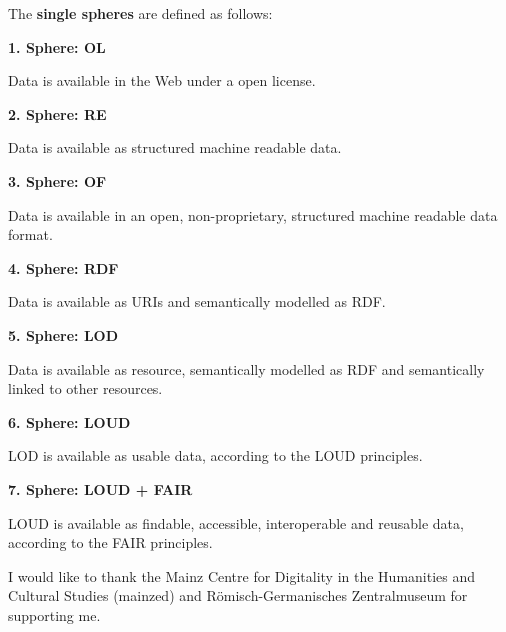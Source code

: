 \documentclass[twocolumn]{autart}
\begin{document}
The \textbf{\textcolor[rgb]{0.5,0,0.5}{single spheres}} are defined as follows:

\textcolor[rgb]{0.5,0,0.5}{\textbf{1. Sphere: OL}}

Data is available in the Web under a open license.

\textcolor[rgb]{0.5,0,0.5}{\textbf{2. Sphere: RE}}

Data is available as structured machine readable data.

\textcolor[rgb]{0.5,0,0.5}{\textbf{3. Sphere: OF}}

Data is available in an open, non-proprietary, structured machine readable data format.

\textcolor[rgb]{0.5,0,0.5}{\textbf{4. Sphere: RDF}}

Data is available as URIs and semantically modelled as RDF.

\textcolor[rgb]{0.5,0,0.5}{\textbf{5. Sphere: LOD}}

Data is available as resource, semantically modelled as RDF and semantically linked to other resources.

\textcolor[rgb]{0.5,0,0.5}{\textbf{6. Sphere: LOUD}}

LOD is available as usable data, according to the LOUD principles.

\textcolor[rgb]{0.5,0,0.5}{\textbf{7. Sphere: LOUD + FAIR}}

LOUD is available as findable, accessible, interoperable and reusable data, according to the FAIR principles.

\begin{ack}                               
I would like to thank the Mainz Centre for Digitality in the Humanities and Cultural Studies (mainzed) and R\"omisch-Germanisches Zentralmuseum for supporting me.
\end{ack}



\end{document}
